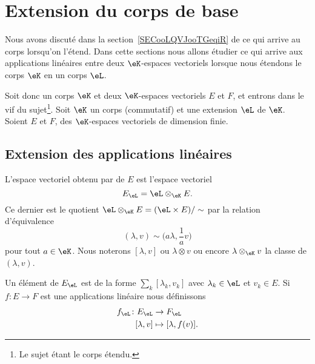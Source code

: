 
\section{Extension du corps de base}
\label{SECooAUOWooNdYTZf}

Nous avons discuté dans la section~\ref{SECooLQVJooTGeqiR} de ce qui arrive au corps lorsqu'on l'étend. Dans cette sections nous allons étudier ce qui arrive aux applications linéaires entre deux \( \eK\)-espaces vectoriels lorsque nous étendons le corps \( \eK\) en un corps \( \eL\).

Soit donc un corps \( \eK\) et deux \( \eK\)-espaces vectoriels \( E\) et \( F\), et entrons dans le vif du sujet\footnote{Le sujet étant le corps étendu.}. Soit \( \eK\) un corps (commutatif) et une extension \( \eL\) de \( \eK\). Soient \( E\) et \( F\), des \( \eK\)-espaces vectoriels de dimension finie.

\subsection{Extension des applications linéaires}


\begin{definition}
    L'espace vectoriel obtenu par  de \( E\) est l'espace vectoriel
    \begin{equation}
        E_{\eL}=\eL\otimes_{\eK}E.
    \end{equation}
    Ce dernier est le quotient \( \eL\otimes_{\eK}E=(\eL\times E)/\sim\) par la relation d'équivalence
    \begin{equation}
        (\lambda,v)\sim\big( a\lambda,\frac{1}{ a }v \big)
    \end{equation}
    pour tout \( a\in \eK\). Nous noterons \( [\lambda,v]\) ou \( \lambda\otimes v\) ou encore \( \lambda\otimes_{\eK}v\) la classe de \( (\lambda,v)\).
\end{definition}
Un élément de \( E_{\eL}\) est de la forme \( \sum_k[\lambda_k,v_k]\) avec \( \lambda_k\in \eL\) et \( v_k\in E\). Si \( f\colon E\to F\) est une applications linéaire nous définissons
\begin{equation}
    \begin{aligned}
        f_{\eL}\colon E_{\eL}&\to F_{\eL} \\
        [\lambda,v]&\mapsto [\lambda,f(v)].
    \end{aligned}
\end{equation}

